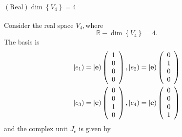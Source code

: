\documentclass[aps,preprint]{revtex4}%
\begin{document}
\paragraph{$\left(  \text{Real}\right)  \dim\left\{  V_{4}\right\}  =4$}

Consider the real space $V_{4},$where
\begin{equation}
\mathbb{R-}\dim\left\{  V_{4}\right\}  =4.
\end{equation}
The basis is
\begin{align}
\left\vert e_{1}\right)   &  =\left\vert \mathbf{e}\right)  \left(
\begin{array}
[c]{c}%
1\\
0\\
0\\
0
\end{array}
\right)  ,\left\vert e_{2}\right)  =\left\vert \mathbf{e}\right)  \left(
\begin{array}
[c]{c}%
0\\
1\\
0\\
0
\end{array}
\right) \\
\left\vert e_{3}\right)   &  =\left\vert \mathbf{e}\right)  \left(
\begin{array}
[c]{c}%
0\\
0\\
1\\
0
\end{array}
\right)  ,\left\vert e_{4}\right)  =\left\vert \mathbf{e}\right)  \left(
\begin{array}
[c]{c}%
0\\
0\\
0\\
1
\end{array}
\right)
\end{align}
and the complex unit $J_{e}$ is given by
\end{document}
